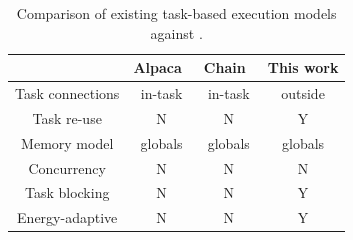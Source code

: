 \begin{table}
	\centering
	\footnotesize
	\begin{tabular}{|c|c|c|c|}
		\hline
		{~} & Alpaca~\cite{alpaca} & Chain~\cite{chain} & This work \\
		\hline\hline
		Task connections & in-task & in-task & outside \\
		Task re-use & N & N & Y\\
		Memory model & globals & globals & globals\\
		Concurrency & N & N & N \\
		Task blocking & N & N & Y \\
		Energy-adaptive & N & N & Y \\
		\hline
	\end{tabular}
	\caption{Comparison of existing task-based execution models against \sys.}
	\label{table:feature_comparison}
\end{table}


%
%



